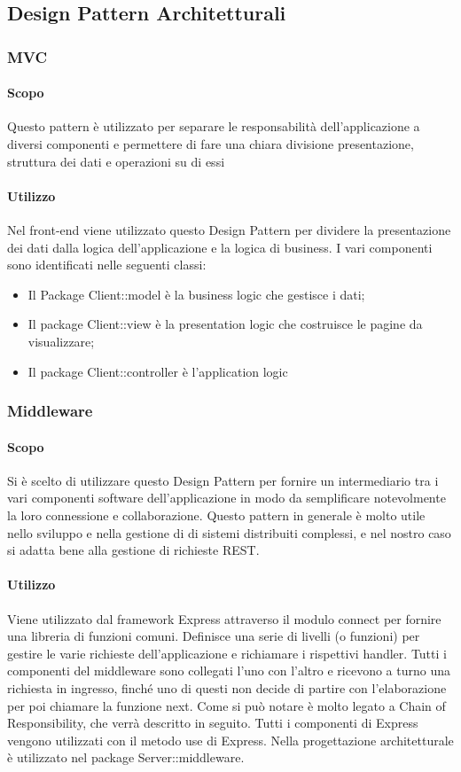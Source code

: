 \documentclass[12pt,a4paper]{article}
\begin{document}
\subsection{Design Pattern Architetturali}
\subsubsection{MVC}
\paragraph{Scopo}
Questo pattern è utilizzato per separare le responsabilità dell’applicazione a diversi componenti e permettere di fare una chiara divisione presentazione, struttura dei dati e operazioni su di essi
\paragraph{Utilizzo}
Nel front-end viene utilizzato questo Design Pattern per dividere la presentazione dei dati dalla logica dell'applicazione e la logica di business. I vari componenti sono identificati nelle seguenti classi:
\begin{itemize}
	\item Il Package Client::model è la business logic che gestisce i dati;
	\item Il package Client::view è la presentation logic che costruisce le pagine da visualizzare;
	\item Il package Client::controller è l'application logic
\end{itemize}

\subsubsection{Middleware}
\paragraph{Scopo}
Si è scelto di utilizzare questo Design Pattern per fornire un intermediario tra i vari componenti software dell’applicazione in modo da semplificare notevolmente la loro connessione e collaborazione. Questo pattern in generale è molto utile nello sviluppo e nella gestione di di sistemi distribuiti complessi, e nel nostro caso si adatta bene alla gestione di richieste REST.
\paragraph{Utilizzo}
Viene utilizzato dal framework Express attraverso il modulo connect per fornire una libreria di funzioni comuni. Definisce una serie di livelli (o funzioni) per gestire le varie richieste dell’applicazione e richiamare i rispettivi handler. Tutti i componenti del middleware sono collegati l’uno con l’altro e ricevono a turno una richiesta in ingresso, finché uno di questi non decide di partire con l’elaborazione per poi chiamare la funzione next. Come si può notare è molto legato a Chain of Responsibility, che verrà descritto in seguito. Tutti i componenti di Express vengono utilizzati con il metodo use di Express. Nella progettazione architetturale è utilizzato nel package Server::middleware.
\end{document}
